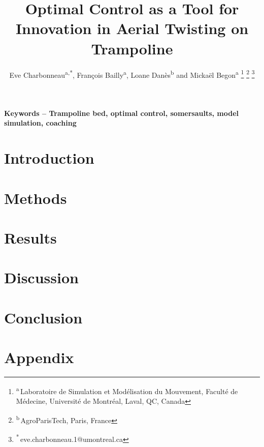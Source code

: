 \documentclass[preprint,12pt]{elsarticle}  %
\title{\LARGE \bf
Optimal Control as a Tool for Innovation in Aerial Twisting on Trampoline
}
\author{Eve Charbonneau\textsuperscript{a,*}, François Bailly\textsuperscript{a}, Loane Danès\textsuperscript{b} and Mickaël Begon\textsuperscript{a}%
\thanks{\textsuperscript{a}\,Laboratoire de Simulation et Modélisation du Mouvement, Faculté de Médecine, Université de Montréal, Laval, QC, Canada}%
\thanks{\textsuperscript{b}\,AgroParisTech, Paris, France}%
\thanks{\textsuperscript{*}\,eve.charbonneau.1@umontreal.ca}
}
\begin{document}
\thispagestyle{empty}
\pagestyle{empty}



\maketitle

\textbf{Keywords -- Trampoline bed, optimal control,  somersaults, model simulation, coaching}

\section{Introduction}\label{sec:introduction}


\section{Methods}\label{sec:methods}


\section{Results}\label{sec:results}


\section{Discussion}\label{sec:discussion}


\section{Conclusion}\label{sec:conclusion}


 


\clearpage

\begingroup
\let\clearpage\relax 
\onecolumn 
\section{Appendix}\label{sec:appendix}

\endgroup
\end{document}
